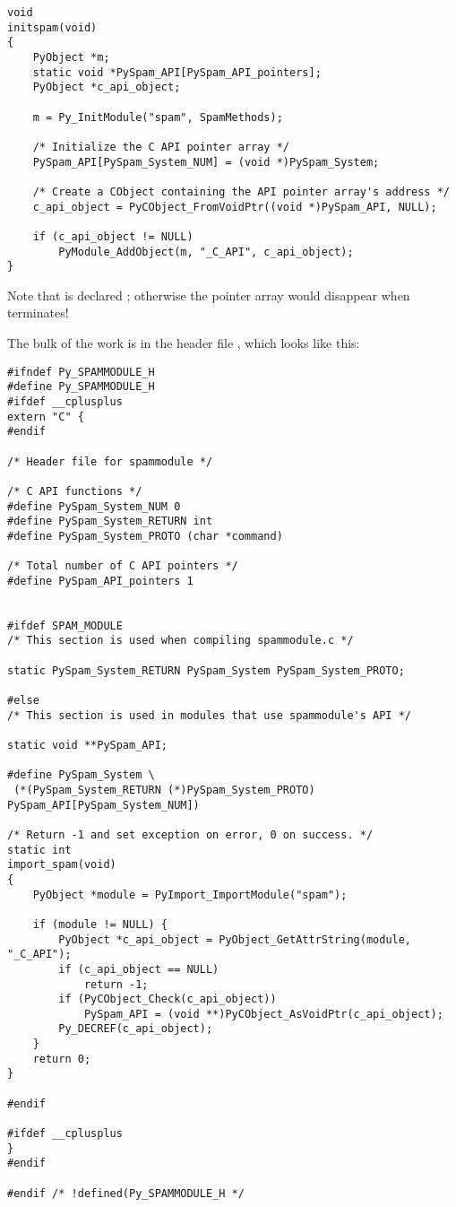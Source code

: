 \begin{verbatim}
void
initspam(void)
{
    PyObject *m;
    static void *PySpam_API[PySpam_API_pointers];
    PyObject *c_api_object;

    m = Py_InitModule("spam", SpamMethods);

    /* Initialize the C API pointer array */
    PySpam_API[PySpam_System_NUM] = (void *)PySpam_System;

    /* Create a CObject containing the API pointer array's address */
    c_api_object = PyCObject_FromVoidPtr((void *)PySpam_API, NULL);

    if (c_api_object != NULL)
        PyModule_AddObject(m, "_C_API", c_api_object);
}
\end{verbatim}

Note that  is declared ; otherwise
the pointer array would disappear when  terminates!

The bulk of the work is in the header file ,
which looks like this:

\begin{verbatim}
#ifndef Py_SPAMMODULE_H
#define Py_SPAMMODULE_H
#ifdef __cplusplus
extern "C" {
#endif

/* Header file for spammodule */

/* C API functions */
#define PySpam_System_NUM 0
#define PySpam_System_RETURN int
#define PySpam_System_PROTO (char *command)

/* Total number of C API pointers */
#define PySpam_API_pointers 1


#ifdef SPAM_MODULE
/* This section is used when compiling spammodule.c */

static PySpam_System_RETURN PySpam_System PySpam_System_PROTO;

#else
/* This section is used in modules that use spammodule's API */

static void **PySpam_API;

#define PySpam_System \
 (*(PySpam_System_RETURN (*)PySpam_System_PROTO) PySpam_API[PySpam_System_NUM])

/* Return -1 and set exception on error, 0 on success. */
static int
import_spam(void)
{
    PyObject *module = PyImport_ImportModule("spam");

    if (module != NULL) {
        PyObject *c_api_object = PyObject_GetAttrString(module, "_C_API");
        if (c_api_object == NULL)
            return -1;
        if (PyCObject_Check(c_api_object))
            PySpam_API = (void **)PyCObject_AsVoidPtr(c_api_object);
        Py_DECREF(c_api_object);
    }
    return 0;
}

#endif

#ifdef __cplusplus
}
#endif

#endif /* !defined(Py_SPAMMODULE_H */
\end{verbatim}

